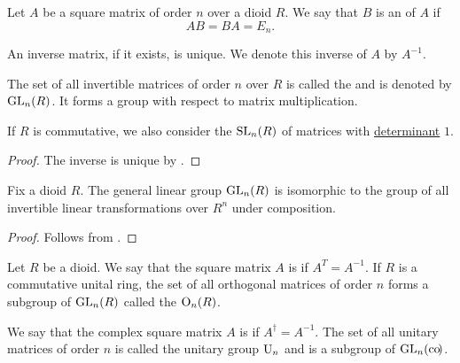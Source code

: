 \begin{definition}\label{def:inverse_matrix}
  Let \( A \) be a square matrix of order \( n \) over a dioid \( R \). We say that \( B \) is an  of \( A \) if
  \begin{equation*}
    AB = BA = E_n.
  \end{equation*}

  An inverse matrix, if it exists, is unique. We denote this inverse of \( A \) by \( A^{-1} \).

  The set of all invertible matrices of order \( n \) over \( R \) is called the  and is denoted by \( \operatorname{GL}_n(R) \). It forms a group with respect to matrix multiplication.

  If \( R \) is commutative, we also consider the  \( \operatorname{SL}_n(R) \) of matrices with \hyperref[def:matrix_determinant]{determinant} \( 1 \).
\end{definition}
\begin{proof}
  The inverse is unique by .
\end{proof}

\begin{proposition}\label{thm:general_linear_group_isomorphic_to_automorphism_group}
  Fix a dioid \( R \). The general linear group \( \operatorname{GL}_n(R) \) is isomorphic to the group of all invertible linear transformations over \( R^n \) under composition.
\end{proposition}
\begin{proof}
  Follows from .
\end{proof}

\begin{definition}\label{def:orthogonal_matrix}
  Let \( R \) be a dioid. We say that the square matrix \( A \) is  if \( A^T = A^{-1} \). If \( R \) is a commutative unital ring, the set of all orthogonal matrices of order \( n \) forms a subgroup of \( \operatorname{GL}_n(R) \) called the  \( \operatorname{O}_n(R) \).
\end{definition}

\begin{definition}\label{def:unitary_matrix}
  We say that the complex square matrix \( A \) is  if \( A^\dagger = A^{-1} \). The set of all unitary matrices of order \( n \) is called the unitary group \( \operatorname{U}_n \) and is a subgroup of \( \operatorname{GL}_n(\operatorname*{co\negthinspace)} \).
\end{definition}

